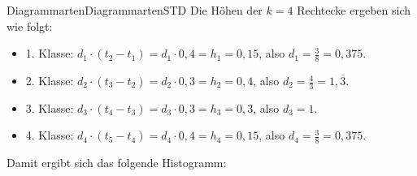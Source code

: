 \begin{MXContent}{Diagrammarten}{Diagrammarten}{STD}
Die Höhen der $k=4$ Rechtecke ergeben sich wie folgt:
\begin{itemize}
\item{1. Klasse: $d_{1}\cdot(t_{2}-t_{1})=d_{1}\cdot 0,4=h_{1}=0,15$, also $d_{1}=\frac{3}{8}=0,375$.}
\item{2. Klasse: $d_{2}\cdot(t_{3}-t_{2})=d_{2}\cdot 0,3=h_{2}=0,4$, also $d_{2}=\frac{4}{3}=1,\overline{3}$.}
\item{3. Klasse: $d_{3}\cdot(t_{4}-t_{3})=d_{3}\cdot 0,3=h_{3}=0,3$, also $d_{3}=1$.}
\item{4. Klasse: $d_{4}\cdot(t_{5}-t_{4})=d_{4}\cdot 0,4=h_{4}=0,15$, also $d_{4}=\frac{3}{8}=0,375$.}
\end{itemize}

Damit ergibt sich das folgende Histogramm:

\begin{center}
\end{center}

\end{MXContent}


